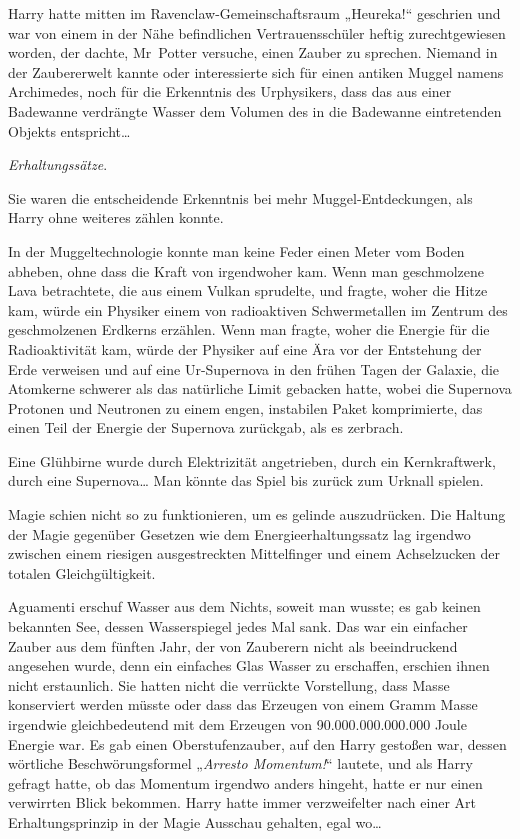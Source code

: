 {Harry hatte mitten im Ravenclaw-Gemeinschaftsraum „Heureka!“ geschrien und war von einem in der Nähe befindlichen Vertrauensschüler heftig zurechtgewiesen worden, der dachte, Mr~Potter versuche, einen Zauber zu sprechen. Niemand in der Zaubererwelt kannte oder interessierte sich für einen antiken Muggel namens Archimedes, noch für die Erkenntnis des Urphysikers, dass das aus einer Badewanne verdrängte Wasser dem Volumen des in die Badewanne eintretenden Objekts entspricht…

\emph{Erhaltungssätze}.

Sie waren die entscheidende Erkenntnis bei mehr Muggel-Entdeckungen, als Harry ohne weiteres zählen konnte.

In der Muggeltechnologie konnte man keine Feder einen Meter vom Boden abheben, ohne dass die Kraft von irgendwoher kam. Wenn man geschmolzene Lava betrachtete, die aus einem Vulkan sprudelte, und fragte, woher die Hitze kam, würde ein Physiker einem von radioaktiven Schwermetallen im Zentrum des geschmolzenen Erdkerns erzählen. Wenn man fragte, woher die Energie für die Radioaktivität kam, würde der Physiker auf eine Ära vor der Entstehung der Erde verweisen und auf eine Ur-Supernova in den frühen Tagen der Galaxie, die Atomkerne schwerer als das natürliche Limit gebacken hatte, wobei die Supernova Protonen und Neutronen zu einem engen, instabilen Paket komprimierte, das einen Teil der Energie der Supernova zurückgab, als es zerbrach.

Eine Glühbirne wurde durch Elektrizität angetrieben, durch ein Kernkraftwerk, durch eine Supernova… Man könnte das Spiel bis zurück zum Urknall spielen.

Magie schien nicht so zu funktionieren, um es gelinde auszudrücken. Die Haltung der Magie gegenüber Gesetzen wie dem Energieerhaltungssatz lag irgendwo zwischen einem riesigen ausgestreckten Mittelfinger und einem Achselzucken der totalen Gleichgültigkeit.

Aguamenti erschuf Wasser aus dem Nichts, soweit man wusste; es gab keinen bekannten See, dessen Wasserspiegel jedes Mal sank. Das war ein einfacher Zauber aus dem fünften Jahr, der von Zauberern nicht als beeindruckend angesehen wurde, denn ein einfaches Glas Wasser zu erschaffen, erschien ihnen nicht erstaunlich. Sie hatten nicht die verrückte Vorstellung, dass Masse konserviert werden müsste oder dass das Erzeugen von einem Gramm Masse irgendwie gleichbedeutend mit dem Erzeugen von 90.000.000.000.000 Joule Energie war. Es gab einen Oberstufenzauber, auf den Harry gestoßen war, dessen wörtliche Beschwörungsformel „\emph{Arresto Momentum!}“ lautete, und als Harry gefragt hatte, ob das Momentum irgendwo anders hingeht, hatte er nur einen verwirrten Blick bekommen. Harry hatte immer verzweifelter nach einer Art Erhaltungsprinzip in der Magie Ausschau gehalten, egal wo…

}
